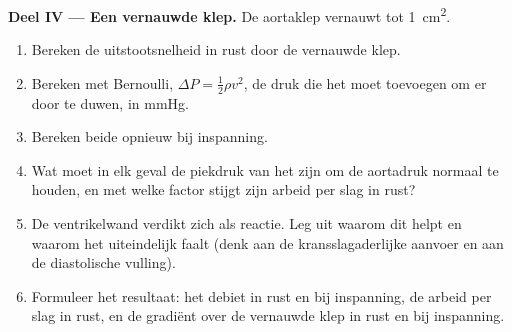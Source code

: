 \begin{problem}
\medskip
\noindent\textbf{Deel IV --- Een vernauwde klep.}
De aortaklep vernauwt tot \qty{1}{cm^2}.
\begin{enumerate}[resume]
  \item Bereken de uitstootsnelheid in rust door de vernauwde klep.
  \item Bereken met Bernoulli, $\Delta P = \tfrac12\rho v^{2}$, de druk die
        het  moet toevoegen om er  door te duwen, in mmHg.
  \item Bereken beide opnieuw bij inspanning.
  \item Wat moet in elk geval de piekdruk van het  zijn om de
        aortadruk normaal te houden, en met welke factor stijgt zijn arbeid
        per slag in rust?
  \item De ventrikelwand verdikt zich als reactie. Leg uit waarom dit helpt
        en waarom het uiteindelijk faalt (denk aan de kransslagaderlijke
        aanvoer en aan de diastolische vulling).
  \item Formuleer het resultaat: het debiet in rust en bij inspanning, de
        arbeid per slag in rust, en de gradiënt over de vernauwde klep in rust
        en bij inspanning.
\end{enumerate}
\end{problem}
